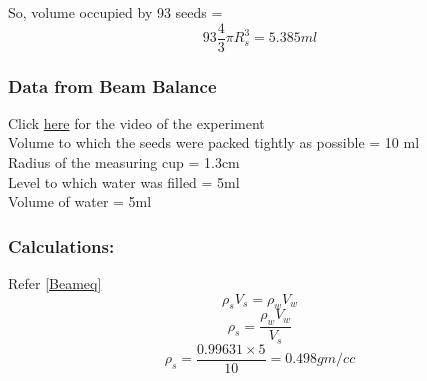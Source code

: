 \documentclass[twocolumn,11pt]{article}
\newcommand{\beq}{\begin{equation}}
\newcommand{\eeq}{\end{equation}}
\begin{document}
So, volume occupied by 93 seeds = 
\beq
\label{Volume of the pepper seeds in the cup}
93\frac{4}{3}\pi R_s^3 = 5.385 ml
\eeq

\subsubsection{Data from Beam Balance}
    Click \href{https://drive.google.com/file/d/16dkCRaP8JWYyElnq-B_HgopsTJ5laUmY/view?usp=drive_link}{here} for the video of the experiment\\
    Volume to which the seeds were packed tightly as possible = 10 ml\\
    Radius of the measuring cup = 1.3cm  \\
    Level to which water was filled = 5ml      \\ 
    Volume of water =  5ml         \\
\subsubsection{Calculations:}
    Refer \eqref{Beameq}
    $$\rho_sV_s = \rho_wV_w$$
    $$\rho_s = \frac{\rho_w V_w}{V_s}$$
    $$\rho_s = \frac{0.99631 \times 5}{10} = 0.498 gm/cc$$
\end{document}
